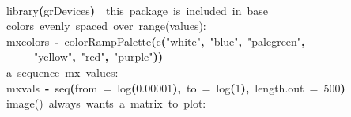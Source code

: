 \documentclass[a4paper]{article}
\newcommand{\hlnumber}[1]{\textcolor[rgb]{0.0823529411764706,0.0784313725490196,0.709803921568627}{#1}}%
\newcommand{\hlfunctioncall}[1]{\textcolor[rgb]{1,0,0}{#1}}%
\newcommand{\hlstring}[1]{\textcolor[rgb]{0.6,0.6,1}{#1}}%
\newcommand{\hlkeyword}[1]{\textcolor[rgb]{0,0,0}{\textbf{#1}}}%
\newcommand{\hlargument}[1]{\textcolor[rgb]{0.694117647058824,0.247058823529412,0.0196078431372549}{#1}}%
\newcommand{\hlcomment}[1]{\textcolor[rgb]{0.8,0.8,0.8}{#1}}%
\newcommand{\hlassignement}[1]{\textcolor[rgb]{0.215686274509804,0.215686274509804,0.384313725490196}{\textbf{#1}}}%
\newcommand{\hlsymbol}[1]{\textcolor[rgb]{0,0,0}{#1}}%
\newcommand{\hlprompt}[1]{\textcolor[rgb]{0,0,0}{#1}}%
\newcommand{\hlstd}[1]{\textcolor[rgb]{0,0,0}{#1}}%
\newenvironment{Houtput}{\raggedright}{%
%
}
\begin{document}
\begin{Houtput}
\hspace*{\fill}\\
\hlstd{}\ttfamily\noindent
\hlprompt{\usebox{\hlnormalsizeboxgreaterthan}{\ }}\hlfunctioncall{library}\hlkeyword{(}\hlsymbol{grDevices}\hlkeyword{)}{\ }{\ }\hlcomment{\usebox{\hlnormalsizeboxhash}{\ }this{\ }package{\ }is{\ }included{\ }in{\ }base}\mbox{}
\normalfont
\hspace*{\fill}\\
\hlstd{}\ttfamily\noindent
\hlprompt{\usebox{\hlnormalsizeboxgreaterthan}{\ }}\hlcomment{\usebox{\hlnormalsizeboxhash}{\ }colors{\ }evenly{\ }spaced{\ }over{\ }range(values):}\mbox{}
\normalfont
\hspace*{\fill}\\
\hlstd{}\ttfamily\noindent
\hlprompt{\usebox{\hlnormalsizeboxgreaterthan}{\ }}\hlsymbol{mxcolors}{\ }\hlassignement{\usebox{\hlnormalsizeboxlessthan}-}{\ }\hlfunctioncall{colorRampPalette}\hlkeyword{(}\hlfunctioncall{c}\hlkeyword{(}\hlstring{"white"}\hlkeyword{,}{\ }\hlstring{"blue"}\hlkeyword{,}{\ }\hlstring{"palegreen"}\hlkeyword{,}\hspace*{\fill}\\
\hlstd{}\hlprompt{{\ }}{\ }{\ }{\ }{\ }\hlstring{"yellow"}\hlkeyword{,}{\ }\hlstring{"red"}\hlkeyword{,}{\ }\hlstring{"purple"}\hlkeyword{)}\hlkeyword{)}\mbox{}
\normalfont
\hspace*{\fill}\\
\hlstd{}\ttfamily\noindent
\hlprompt{\usebox{\hlnormalsizeboxgreaterthan}{\ }}\hlcomment{\usebox{\hlnormalsizeboxhash}{\ }a{\ }sequence{\ }mx{\ }values:}\mbox{}
\normalfont
\hspace*{\fill}\\
\hlstd{}\ttfamily\noindent
\hlprompt{\usebox{\hlnormalsizeboxgreaterthan}{\ }}\hlsymbol{mxvals}{\ }\hlassignement{\usebox{\hlnormalsizeboxlessthan}-}{\ }\hlfunctioncall{seq}\hlkeyword{(}\hlargument{from}{\ }\hlargument{=}{\ }\hlfunctioncall{log}\hlkeyword{(}\hlnumber{0.00001}\hlkeyword{)}\hlkeyword{,}{\ }\hlargument{to}{\ }\hlargument{=}{\ }\hlfunctioncall{log}\hlkeyword{(}\hlnumber{1}\hlkeyword{)}\hlkeyword{,}{\ }\hlargument{length.out}{\ }\hlargument{=}{\ }\hlnumber{500}\hlkeyword{)}\mbox{}
\normalfont
\hspace*{\fill}\\
\hlstd{}\ttfamily\noindent
\hlprompt{\usebox{\hlnormalsizeboxgreaterthan}{\ }}\hlcomment{\usebox{\hlnormalsizeboxhash}{\ }image(){\ }always{\ }wants{\ }a{\ }matrix{\ }to{\ }plot:}\mbox{}

\end{Houtput}
\end{document}
